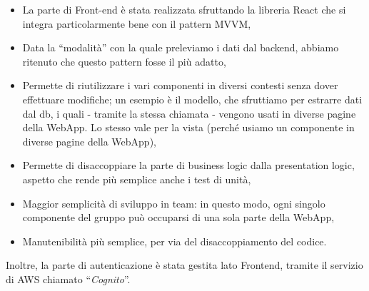 \begin{itemize}
\item La parte di Front-end è stata realizzata sfruttando la libreria React che si integra particolarmente bene con il pattern MVVM,
\item Data la “modalità” con la quale preleviamo i dati dal backend, abbiamo ritenuto che questo pattern fosse il più adatto,
\item Permette di riutilizzare i vari componenti in diversi contesti senza dover effettuare modifiche; un esempio è il modello, che sfruttiamo per estrarre dati dal db, i quali - tramite la stessa chiamata - vengono usati in diverse pagine della WebApp. Lo stesso vale per la vista (perché usiamo un componente in diverse pagine della WebApp),
\item Permette di disaccoppiare la parte di business logic dalla presentation logic, aspetto che rende più semplice anche i test di unità,
\item Maggior semplicità di sviluppo in team: in questo modo, ogni singolo componente del gruppo può occuparsi di una sola parte della WebApp,
\item Manutenibilità più semplice, per via del disaccoppiamento del codice.
\end{itemize}
Inoltre, la parte di autenticazione è stata gestita lato Frontend, tramite il servizio di AWS chiamato “\textit{Cognito}”.
